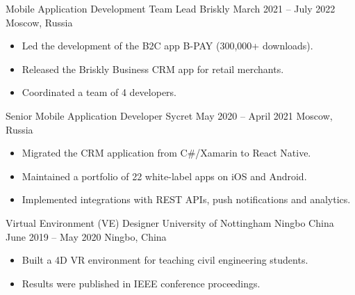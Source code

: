 \documentclass[10pt,a4paper,ragged2e]{altacv}
\begin{document}
\cvevent
  {Mobile Application Development Team Lead}
  {Briskly}
  {March 2021 -- July 2022}
  {Moscow, Russia}
\begin{itemize}
  \item Led the development of the B2C app B-PAY (300,000+ downloads).
  \item Released the Briskly Business CRM app for retail merchants.
  \item Coordinated a team of 4 developers.
\end{itemize}
\divider

\cvevent
  {Senior Mobile Application Developer}
  {Sycret}
  {May 2020 -- April 2021}
  {Moscow, Russia}
\begin{itemize}
  \item Migrated the CRM application from C\#/Xamarin to React Native.
  \item Maintained a portfolio of 22 white-label apps on iOS and Android.
  \item Implemented integrations with REST APIs, push notifications and analytics.
\end{itemize}
\divider

\cvevent
  {Virtual Environment (VE) Designer}
  {University of Nottingham Ningbo China}
  {June 2019 -- May 2020}
  {Ningbo, China}
\begin{itemize}
  \item Built a 4D VR environment for teaching civil engineering students.
  \item Results were published in IEEE conference proceedings.
\end{itemize}
\end{document}
